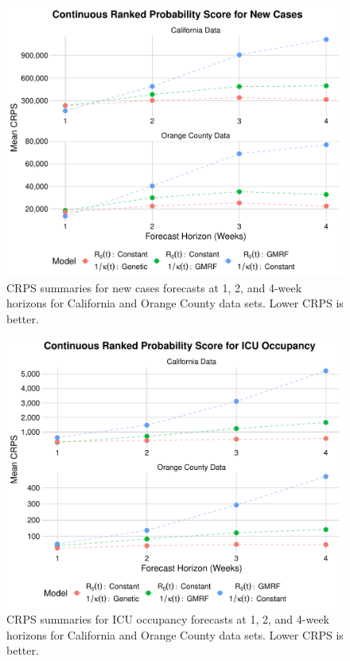 \begin{figure}
    \centering
    \includegraphics[width=1.0\columnwidth]{real_data_crps_comparison_dotplot_data_new_cases_plot}
    \caption[CRPS summaries for new cases forecasts for real data sets.]{CRPS summaries for new cases forecasts at 1, 2, and 4-week horizons for California and Orange County data sets. Lower CRPS is better.}
    \label{ch_5:fig:real_data_crps_comparison_dotplot_data_new_cases_plot}
\end{figure}

\begin{figure}
    \centering
    \includegraphics[width=1.0\columnwidth]{real_data_crps_comparison_dotplot_data_icu_plot}
    \caption[CRPS summaries for ICU occupancy forecasts for real data sets.]{CRPS summaries for ICU occupancy forecasts at 1, 2, and 4-week horizons for California and Orange County data sets. Lower CRPS is better.}
    \label{ch_5:fig:real_data_crps_comparison_dotplot_data_icu_plot}
\end{figure}

